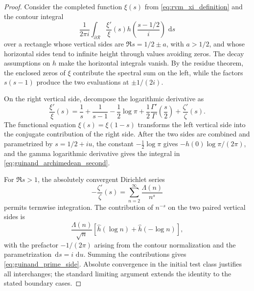 \documentclass[11pt]{amsart}
\numberwithin{equation}{section}
\theoremstyle{plain}
\theoremstyle{definition}
\theoremstyle{remark}
\newcommand{\1}{\mathbf{1}}
\newcommand{\dd}{\,\mathrm{d}}
\begin{document}
\begin{proof}
Consider the completed function \(\xi(s)\) from
\eqref{eq:rvm_xi_definition} and the contour integral
\begin{equation}
\frac1{2\pi i}
\int_{\partial\mathcal R}
\frac{\xi'}{\xi}(s)
 h\!\left(\frac{s-1/2}{i}\right)\,\dd s
\label{eq:guinand_contour_integral}
\end{equation}
over a rectangle whose vertical sides are \(\Re s=1/2\pm a\), with
\(a>1/2\), and whose horizontal sides tend to infinite height through
values avoiding zeros.  The decay assumptions on \(h\) make the horizontal
integrals vanish.  By the residue theorem, the enclosed zeros of \(\xi\)
contribute the spectral sum on the left, while the factors \(s(s-1)\)
produce the two evaluations at \(\pm1/(2i)\).

On the right vertical side, decompose the logarithmic derivative as
\begin{equation}
\frac{\xi'}{\xi}(s)
=
\frac1s+\frac1{s-1}
-
\frac12\log\pi
+
\frac12\frac{\Gamma'}{\Gamma}\!\left(\frac s2\right)
+
\frac{\zeta'}{\zeta}(s).
\label{eq:guinand_log_derivative_decomposition}
\end{equation}
The functional equation \(\xi(s)=\xi(1-s)\) transforms the left vertical
side into the conjugate contribution of the right side.  After the two
sides are combined and parametrized by \(s=1/2+iu\), the constant
\(-\frac12\log\pi\) gives
\(-\widehat h(0)\log\pi/(2\pi)\), and the gamma logarithmic derivative
gives the integral in \eqref{eq:guinand_archimedean_second}.

For \(\Re s>1\), the absolutely convergent Dirichlet series
\begin{equation}
-\frac{\zeta'}{\zeta}(s)
=
\sum_{n=2}^{\infty}\frac{\Lambda(n)}{n^s}
\label{eq:guinand_log_zeta_series}
\end{equation}
permits termwise integration.  The contribution of \(n^{-s}\) on the two
paired vertical sides is
\begin{equation}
\frac{\Lambda(n)}{\sqrt n}
\left[
\widehat h(\log n)+\widehat h(-\log n)
\right],
\label{eq:guinand_fourier_prime_pair}
\end{equation}
with the prefactor \(-1/(2\pi)\) arising from the contour normalization and
the parametrization \(\dd s=i\,\dd u\).  Summing the contributions gives
\eqref{eq:guinand_prime_side}.  Absolute convergence in the initial test
class justifies all interchanges; the standard limiting argument extends
the identity to the stated boundary cases.
\end{proof}
\end{document}
